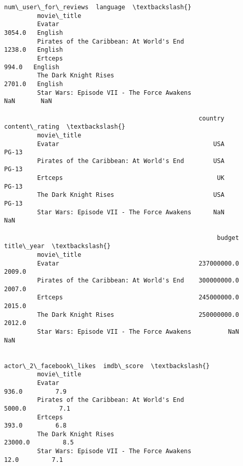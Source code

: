 \documentclass[11pt]{article}
\begin{document}
\begin{Verbatim}[commandchars=\\\{\}]
                                                    num\_user\_for\_reviews  language  \textbackslash{}
         movie\_title                                                                 
         Evatar                                                   3054.0   English   
         Pirates of the Caribbean: At World's End                 1238.0   English   
         Ertceps                                                   994.0   English   
         The Dark Knight Rises                                    2701.0   English   
         Star Wars: Episode VII - The Force Awakens                  NaN       NaN   
         
                                                     country content\_rating  \textbackslash{}
         movie\_title                                                          
         Evatar                                          USA          PG-13   
         Pirates of the Caribbean: At World's End        USA          PG-13   
         Ertceps                                          UK          PG-13   
         The Dark Knight Rises                           USA          PG-13   
         Star Wars: Episode VII - The Force Awakens      NaN            NaN   
         
                                                          budget title\_year  \textbackslash{}
         movie\_title                                                          
         Evatar                                      237000000.0     2009.0   
         Pirates of the Caribbean: At World's End    300000000.0     2007.0   
         Ertceps                                     245000000.0     2015.0   
         The Dark Knight Rises                       250000000.0     2012.0   
         Star Wars: Episode VII - The Force Awakens          NaN        NaN   
         
                                                    actor\_2\_facebook\_likes  imdb\_score  \textbackslash{}
         movie\_title                                                                     
         Evatar                                                      936.0         7.9   
         Pirates of the Caribbean: At World's End                   5000.0         7.1   
         Ertceps                                                     393.0         6.8   
         The Dark Knight Rises                                     23000.0         8.5   
         Star Wars: Episode VII - The Force Awakens                   12.0         7.1   
         

\end{Verbatim}
\end{document}
